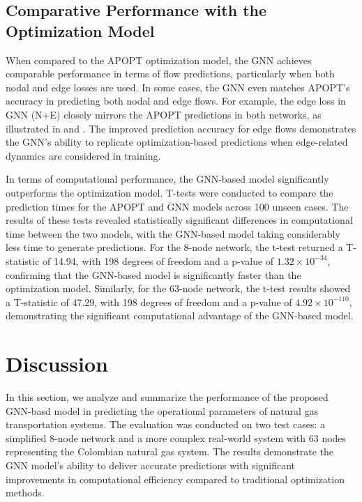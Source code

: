 \subsection{Comparative Performance with the Optimization Model}

When compared to the APOPT optimization model, the GNN achieves comparable performance in terms of flow predictions, particularly when both nodal and edge losses are used. In some cases, the GNN even matches APOPT’s accuracy in predicting both nodal and edge flows. For example, the edge loss in GNN (N+E) closely mirrors the APOPT predictions in both networks, as illustrated in  and . The improved prediction accuracy for edge flows demonstrates the GNN's ability to replicate optimization-based predictions when edge-related dynamics are considered in training.

In terms of computational performance, the GNN-based model significantly outperforms the optimization model. T-tests were conducted to compare the prediction times for the APOPT and GNN models across 100 unseen cases. The results of these tests revealed statistically significant differences in computational time between the two models, with the GNN-based model taking considerably less time to generate predictions. For the 8-node network, the t-test returned a T-statistic of 14.94, with 198 degrees of freedom and a p-value of $1.32 \times 10^{-34}$, confirming that the GNN-based model is significantly faster than the optimization model. Similarly, for the 63-node network, the t-test results showed a T-statistic of 47.29, with 198 degrees of freedom and a p-value of $4.92 \times 10^{-110}$, demonstrating the significant computational advantage of the GNN-based model.





\section{Discussion}

In this section, we analyze and summarize the performance of the proposed GNN-basd model in predicting the operational parameters of natural gas transportation systems. The evaluation was conducted on two test cases: a simplified 8-node network and a more complex real-world system with 63 nodes representing the Colombian natural gas system. The results demonstrate the GNN model's ability to deliver accurate predictions with significant improvements in computational efficiency compared to traditional optimization methods.

